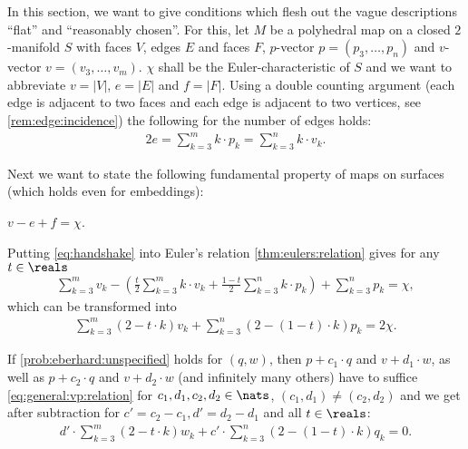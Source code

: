 In this section, we want to give conditions which flesh out the vague descriptions ``flat'' and ``reasonably chosen''. 
For this, let $M$ be a polyhedral map on a closed $2$-manifold $S$ with faces $V$, edges $E$ and faces $F$, $p$-vector $p = (p_3, \dots, p_n)$ and $v$-vector $v = (v_3, \dots, v_m)$. $\chi$ shall be the {\sc Euler}-characteristic of $S$ and we want to abbreviate $v = |V|$, $e = |E|$ and $f = |F|$. Using a double counting argument (each edge is adjacent to two faces and each edge is adjacent to two vertices, see \autoref{rem:edge:incidence}) the following for the number of edges holds:
\begin{align}
  2e = \sum_{k=3}^{m} k \cdot p_k = \sum_{k=3}^{n} k \cdot v_k \label{eq:handshake}.
\end{align}

Next we want to state the following fundamental property of maps on surfaces (which holds even for embeddings):
\begin{theorem}\label{thm:eulers:relation} $v - e + f = \chi$.
\end{theorem}

Putting \autoref{eq:handshake} into Euler's relation \autoref{thm:eulers:relation} gives for any $t \in \reals$ 
\begin{align*}
  \sum_{k=3}^m v_k - \left(\frac{t}{2} \sum_{k=3}^m k \cdot v_k + \frac{1-t}{2} \sum_{k=3}^n k \cdot p_k \right) + \sum_{k=3}^n p_k = \chi,
\end{align*}
which can be transformed into
\begin{align}
  \sum_{k=3}^m (2 - t \cdot k ) v_k + \sum_{k=3}^n ( 2 - (1 - t) \cdot k ) p_k = 2 \chi. \label{eq:general:vp:relation}
\end{align}

If \autoref{prob:eberhard:unspecified} holds for $(q, w)$, then $p + c_1 \cdot q$ and $v + d_1 \cdot w$, as well as $p + c_2 \cdot q$ and $v + d_2 \cdot w$ (and infinitely many others) have to suffice \autoref{eq:general:vp:relation} for $c_1, d_1, c_2, d_2 \in \nats$, $(c_1, d_1) \neq (c_2, d_2)$ and we get after subtraction for $c' = c_2 - c_1, d' = d_2 - d_1$ and all $t \in \reals$:
\begin{align*}
  d' \cdot \sum_{k=3}^m \left(2 - t \cdot k \right) w_k + c' \cdot \sum_{k=3}^n \left( 2 - (1 - t) \cdot k \right) q_k = 0. 
\end{align*}

